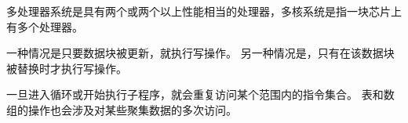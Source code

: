 {    %
    \begin{reviewc}
        多处理器系统是具有两个或两个以上性能相当的处理器，多核系统是指一块芯片上有多个处理器。
    \end{reviewc}

    \begin{reviewc}
        一种情况是只要数据块被更新，就执行写操作。
        另一种情况是，只有在该数据块被替换时才执行写操作。
    \end{reviewc}

    \begin{reviewc}
        一旦进入循环或开始执行子程序，就会重复访问某个范围内的指令集合。
        表和数组的操作也会涉及对某些聚集数据的多次访问。
    \end{reviewc}
}
